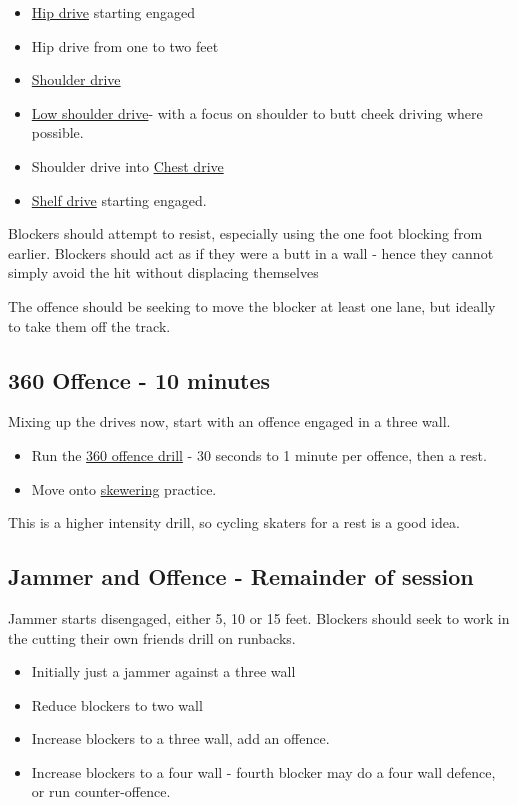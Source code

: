 \documentclass{journal}
\begin{document}
\begin{itemize}
\item \hyperref[drill:drives/hip]{Hip drive} starting engaged
\item Hip drive from one to two feet 
\item \hyperref[drill:drives/shoulder]{Shoulder drive} 
\item \hyperref[drill:drives/low_shoulder]{Low shoulder drive}- with a focus on shoulder to butt cheek driving where possible. 
\item Shoulder drive into \hyperref[drill:drives/chest]{Chest drive}
\item \hyperref[drill:drives/shelf]{Shelf drive} starting engaged.
\end{itemize}

Blockers should attempt to resist, especially using the one foot blocking from earlier.
Blockers should act as if they were a butt in a wall - hence they cannot simply avoid the hit without displacing themselves 

The offence should be seeking to move the blocker at least one lane, but ideally to take them off the track. 

\subsection*{360 Offence - 10 minutes}

Mixing up the drives now, start with an offence engaged in a three wall. 

\begin{itemize}
\item Run the \hyperref[drill:three_wall/360_offence]{360 offence drill} - 30 seconds to 1 minute per offence, then a rest.
\item Move onto \hyperref[drill:three_wall/skewering]{skewering} practice.
\end{itemize}

This is a higher intensity drill, so cycling skaters for a rest is a good idea.


\subsection*{Jammer and Offence - Remainder of session}

Jammer starts disengaged, either 5, 10 or 15 feet.
Blockers should seek to work in the cutting their own friends drill on runbacks. 


\begin{itemize}
\item Initially just a jammer against a three wall
\item Reduce blockers to two wall
\item Increase blockers to a three wall, add an offence.
\item Increase blockers to a four wall - fourth blocker may do a four wall defence, or run counter-offence.
\end{itemize}
\end{document}
